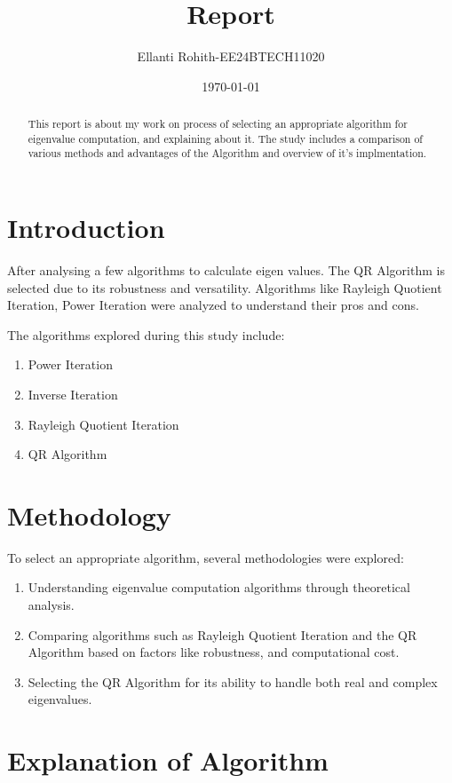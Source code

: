 \documentclass[12pt]{article}
\title{\textbf{Report}}
\author{Ellanti Rohith-EE24BTECH11020}
\date{\today}
\begin{document}
\maketitle

\begin{abstract}
This report is about my work on process of selecting an appropriate algorithm for eigenvalue computation, and explaining about it. The study includes a comparison of various methods and advantages of the Algorithm and overview of it's implmentation. 
\end{abstract}
\tableofcontents
\newpage


\section{Introduction}
After analysing a few algorithms to calculate eigen values. The QR Algorithm is  selected  due to its robustness and versatility. Algorithms like  Rayleigh Quotient Iteration, Power Iteration were analyzed to understand their pros and cons. 

The algorithms explored during this study include:
\begin{enumerate}
    \item Power Iteration
    \item Inverse Iteration
    \item Rayleigh Quotient Iteration
      \item QR Algorithm 
\end{enumerate}

\section{Methodology}
To select an appropriate algorithm, several methodologies were explored:
\begin{enumerate}[label=\arabic*.]
    \item Understanding eigenvalue computation algorithms through theoretical analysis.
    \item Comparing algorithms such as Rayleigh Quotient Iteration and the QR Algorithm based on factors like  robustness, and computational cost.
    \item Selecting the QR Algorithm for its ability to handle both real and complex eigenvalues.
\end{enumerate}


   

\section{Explanation of Algorithm}
\end{document}
